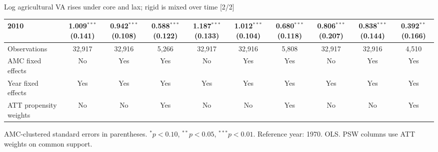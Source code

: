 \documentclass[aspectratio=169]{beamer}
\begin{document}
\begin{frame}{Log agricultural VA rises under core and lax; rigid is mixed over time [2/2]}
{\begin{tabular}{@{}l*{9}{c}@{}}
2010 & \shortstack{1.009$^{***}$\\(0.141)} & \shortstack{0.942$^{***}$\\(0.108)} & \shortstack{0.588$^{***}$\\(0.122)} & \shortstack{1.187$^{***}$\\(0.133)} & \shortstack{1.012$^{***}$\\(0.104)} & \shortstack{0.680$^{***}$\\(0.118)} & \shortstack{0.806$^{***}$\\(0.207)} & \shortstack{0.838$^{***}$\\(0.144)} & \shortstack{0.392$^{**}$\\(0.166)} \\
\midrule
Observations & 32,917 & 32,916 & 5,266 & 32,917 & 32,916 & 5,808 & 32,917 & 32,916 & 4,510 \\
AMC fixed effects & No & Yes & Yes & No & Yes & Yes & No & Yes & Yes \\
Year fixed effects & Yes & Yes & Yes & Yes & Yes & Yes & Yes & Yes & Yes \\
ATT propensity weights & No & No & Yes & No & No & Yes & No & No & Yes \\
\bottomrule
\end{tabular}%
}
\vspace{0.1em}
{\tiny\color{ZMidGray} AMC-clustered standard errors in parentheses. $^{*}p<0.10$, $^{**}p<0.05$, $^{***}p<0.01$. Reference year: 1970. OLS. PSW columns use ATT weights on common support.}
\end{frame}
\end{document}
